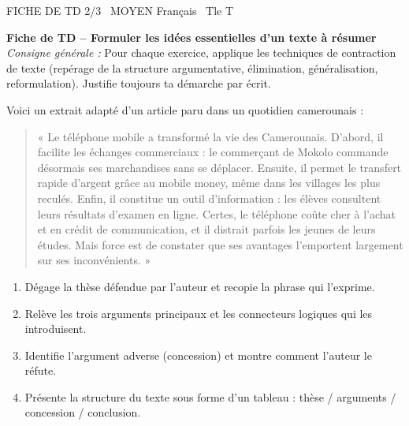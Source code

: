 \documentclass[11pt]{article}
\begin{document}
\begin{tcolorbox}[enhanced,colback=popink,colframe=popink,arc=10pt,boxrule=0pt,left=12pt,right=12pt,top=9pt,bottom=9pt]
{\color{white}\popxbold\small FICHE DE TD 2/3 \textbullet\ MOYEN \hfill Français \textbullet\ Tle T\par}
\end{tcolorbox}
\vspace{4pt}
\textbf{Fiche de TD -- Formuler les idées essentielles d'un texte à résumer}\\
\textit{Consigne générale :} Pour chaque exercice, applique les techniques de contraction de texte (repérage de la structure argumentative, élimination, généralisation, reformulation). Justifie toujours ta démarche par écrit.

\begin{exercice}
Voici un extrait adapté d'un article paru dans un quotidien camerounais :
\begin{quote}
« Le téléphone mobile a transformé la vie des Camerounais. D'abord, il facilite les échanges commerciaux : le commerçant de Mokolo commande désormais ses marchandises sans se déplacer. Ensuite, il permet le transfert rapide d'argent grâce au mobile money, même dans les villages les plus reculés. Enfin, il constitue un outil d'information : les élèves consultent leurs résultats d'examen en ligne. Certes, le téléphone coûte cher à l'achat et en crédit de communication, et il distrait parfois les jeunes de leurs études. Mais force est de constater que ses avantages l'emportent largement sur ses inconvénients. »
\end{quote}
\begin{enumerate}
\item Dégage la thèse défendue par l'auteur et recopie la phrase qui l'exprime.
\item Relève les trois arguments principaux et les connecteurs logiques qui les introduisent.
\item Identifie l'argument adverse (concession) et montre comment l'auteur le réfute.
\item Présente la structure du texte sous forme d'un tableau : thèse / arguments / concession / conclusion.
\end{enumerate}
\end{exercice}
\end{document}
